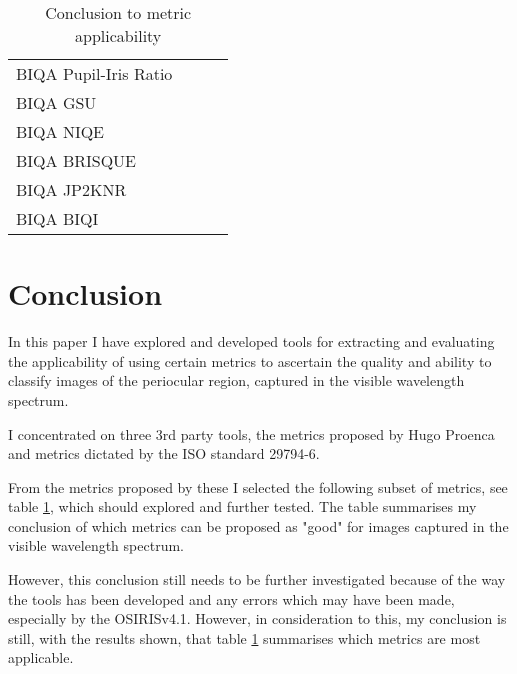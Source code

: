\begin{table}[h]
\begin{minipage}{0.48\linewidth}
\begin{tabular}{l  r r r}
		 BIQA Pupil-Iris Ratio			& \checkmark  & 		\\
		 BIQA GSU										& \checkmark  & 		\\
		 BIQA NIQE									& \checkmark  & 		\\
		 BIQA BRISQUE								& \checkmark  & 		\\
		 BIQA JP2KNR								&	\checkmark  & 		\\
		 BIQA BIQI									& \checkmark  & 		\\\hline
	\end{tabular}
	\caption{Conclusion to metric applicability}
	\label{tab:appl}
\end{minipage}
\end{table}


\section{Conclusion}
\label{sec:conc}
In this paper I have explored and developed tools for extracting and evaluating
the applicability of using certain metrics to ascertain the quality and ability
to classify images of the periocular region, captured in the visible wavelength
spectrum.

I concentrated on three 3rd party tools, the metrics proposed by Hugo
Proenca\cite{hugo} and metrics dictated by the ISO standard 29794-6\cite{iso}.

From the metrics proposed by these I selected the following subset of metrics,
see table \ref{tab:appl}, which should explored and further tested.  The table
summarises my conclusion of which metrics can be proposed as "good" for images
captured in the visible wavelength spectrum.

However, this conclusion still needs to be further investigated because of the
way the tools has been developed and any errors which may have been made,
especially by the OSIRISv4.1\cite{osiris}.  However, in consideration to this,
my conclusion is still, with the results shown, that table \ref{tab:appl} 
summarises which metrics are most applicable.



